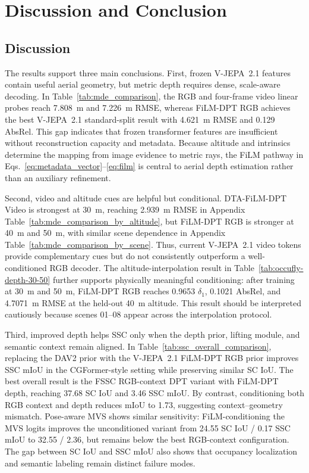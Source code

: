 \section{Discussion and Conclusion}
\label{sec:discussion_conclusion}

\subsection{Discussion}
\label{sec:discussion}

The results support three main conclusions. First, frozen V-JEPA~2.1 features contain useful aerial geometry, but metric depth requires dense, scale-aware decoding. In Table~\ref{tab:mde_comparison}, the RGB and four-frame video linear probes reach 7.808~m and 7.226~m RMSE, whereas FiLM-DPT RGB achieves the best V-JEPA~2.1 standard-split result with 4.621~m RMSE and 0.129 AbsRel. This gap indicates that frozen transformer features are insufficient without reconstruction capacity and metadata. Because altitude and intrinsics determine the mapping from image evidence to metric rays, the FiLM pathway in Eqs.~\eqref{eq:metadata_vector}--\eqref{eq:film} is central to aerial depth estimation rather than an auxiliary refinement.

Second, video and altitude cues are helpful but conditional. DTA-FiLM-DPT Video is strongest at 30~m, reaching 2.939~m RMSE in Appendix Table~\ref{tab:mde_comparison_by_altitude}, but FiLM-DPT RGB is stronger at 40~m and 50~m, with similar scene dependence in Appendix Table~\ref{tab:mde_comparison_by_scene}. Thus, current V-JEPA~2.1 video tokens provide complementary cues but do not consistently outperform a well-conditioned RGB decoder. The altitude-interpolation result in Table~\ref{tab:occufly-depth-30-50} further supports physically meaningful conditioning: after training at 30~m and 50~m, FiLM-DPT RGB reaches 0.9653 $\delta_1$, 0.1021 AbsRel, and 4.7071~m RMSE at the held-out 40~m altitude. This result should be interpreted cautiously because scenes 01--08 appear across the interpolation protocol.

Third, improved depth helps SSC only when the depth prior, lifting module, and semantic context remain aligned. In Table~\ref{tab:ssc_overall_comparison}, replacing the DAV2 prior with the V-JEPA~2.1 FiLM-DPT RGB prior improves SSC mIoU in the CGFormer-style setting while preserving similar SC IoU. The best overall result is the FSSC RGB-context DPT variant with FiLM-DPT depth, reaching 37.68 SC IoU and 3.46 SSC mIoU. By contrast, conditioning both RGB context and depth reduces mIoU to 1.73, suggesting context--geometry mismatch. Pose-aware MVS shows similar sensitivity: FiLM-conditioning the MVS logits improves the unconditioned variant from 24.55 SC IoU / 0.17 SSC mIoU to 32.55 / 2.36, but remains below the best RGB-context configuration. The gap between SC IoU and SSC mIoU also shows that occupancy localization and semantic labeling remain distinct failure modes.

